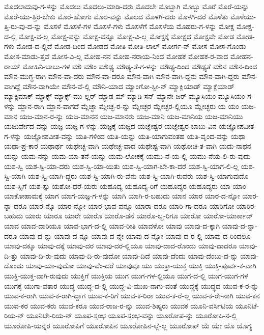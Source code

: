 {ಮೊದಲಾದುವು-ಗ-ಳನ್ನು
ಮೊದಲು
ಮೊದಲು-ಮಾಡಿ-ದರು
ಮೊದಲೇ
ಮೊಬ್ಬಾಗಿ
ಮೊಬ್ಬು
ಮೊರೆ
ಮೊರೆ-ಯನ್ನು
ಮೊರೆ-ಯು-ತ್ತಿರ-ಬೇಕು
ಮೊರೆ-ಹೋಗು
ಮೊಲ-ವನ್ನು
ಮೊಲದ
ಮೊಳಗಿ-ದರು
ಮೊಳಗಿ-ದರೆ
ಮೊಳೆತು
ಮೊಳೆಯು-ತ್ತಿ-ರು-ವು-ದ-ನ್ನು
ಮೊಸಳೆ
ಮೊಸಳೆ-ಗಳ
ಮೊಸಳೆ-ಗಳು
ಮೊಸಳೆಗೆ
ಮೊಸಳೆಯ
ಮೊಹರು-ಗ-ಳನ್ನು
ಮೋಕ್ಷ
ಮೋಕ್ಷ-ದ-ಲ್ಲಿ
ಮೋಕ್ಷ-ವ-ಲ್ಲ
ಮೋಕ್ಷ-ವನ್ನು
ಮೋಕ್ಷ-ವನ್ನೂ
ಮೋಕ್ಷ-ವಿ-ಲ್ಲ
ಮೋಕ್ಷಕ್ಕೆ
ಮೋಕ್ಷದ
ಮೋಕ್ಷವೇ
ಮೋಡ
ಮೋಡ-ಗಳು
ಮೋಡ-ದ-ಲ್ಲಿದೆ
ಮೋಡ-ದಿಂದ
ಮೋಡದ
ಮೋತಿ
ಮೋತಿ-ಲಾಲ್
ಮೋರ್ಗ-ನ್
ಮೋಸ
ಮೋಸ-ಗೊಂಡು
ಮೋಸ-ಮಾಡು-ತ್ತವೆ
ಮೋಸ-ವಿ-ಲ್ಲ
ಮೋಹ-ನನ
ಮೋಹ-ನರಾಯ-ನಿಂದ
ಮೋಹಕ
ಮೋಹಕ-ರ-ವಾದ
ಮೋಹನ-ರಾಯ್
ಮೋಹಿನಿ-ಬಾಬು-ಗಳ
ಮೌ
ಮೌಂ
ಮೌಢ್ಯ
ಮೌಢ್ಯ-ತೆ-ಗ-ಳನ್ನು
ಮೌಢ್ಯ-ದಿಂದ
ಮೌಢ್ಯತೆ
ಮೌನ
ಮೌನ-ದಿಂದ
ಮೌನ-ಮುಗ್ಧ-ರಾಗಿ
ಮೌನ-ವಾ-ದರು
ಮೌನ-ವಾ-ದರೂ
ಮೌನ-ವಾಗಿ
ಮೌನ-ವಾಗಿ-ದ್ದನು
ಮೌನ-ವಾಗಿ-ದ್ದರು
ಮೌನ-ವಾಗಿದ್ದೆ
ಮೌನ-ವಾಗಿಯೇ
ಮೌನ-ವೆ-ಲ್ಲಿ
ಮೌನಿ-ಯಾದ
ಮ್ಯಾಂಗೋ-ಸ್ಪೀ-ನ್
ಮ್ಯಾಕ್ಲಿಯಾಡ್
ಮ್ಯಾಕ್ಲೆಯಾಡ್
ಮ್ಯಾಕ್ಸಿಮಾಕ್
ಮ್ಯಾಕ್ಸ್
ಮ್ಯಾಕ್ಸ್-ಮು-ಲ್ಲರ್
ಮ್ಯಾಡ-ಮ್
ಮ್ಯಾಡಿ-ಸನ್
ಮ್ಯಾನೇ-ಜರ್
ಮ್ಯೂಸಿಯಂ
ಮ್ಯೂಸಿಯಂ-ಗ-ಳನ್ನು
ಮ್ಲಾನ-ರಾಗಿ
ಮ್ಲಾನ-ವಾಗದೆ
ಮ್ಲೆಚ್ಛಾ
ಮ್ಲೇಚ್ಛ-ರ-ನ್ನು
ಮ್ಲೇಚ್ಛರ
ಮ್ಲೇಚ್ಛರ-ಲ್ಲಿಯೂ
ಮ್ಲೇಚ್ಛರು
ಯ
ಯಂ
ಯಜ-ಮಾನ
ಯಜ-ಮಾನ-ರ-ನ್ನು
ಯಜ-ಮಾನನ
ಯಜ-ಮಾನರು
ಯಜ-ಮಾನಿ
ಯಜ-ಮಾನಿಯ
ಯಜ-ಮಾನಿಯು
ಯಜುರ್ವೇದ-ವನ್ನು
ಯಜ್ಞ
ಯಜ್ಞ-ಗ-ಳನ್ನು
ಯಜ್ಞಕ್ಕೆ
ಯಜ್ಞದ
ಯಜ್ಞೇಶ್ವರ
ಯಜ್ಞೇಶ್ವರ-ಬಾಬು-ವಿನ
ಯಜ್ಞೋಪವೀತ-ಗ-ಳನ್ನು
ಯಜ್ಞೋಪವೀತ-ವನ್ನು
ಯತಿ-ಗಳಿಂದ
ಯತಿ-ಯನ್ನು
ಯತಿ-ಯಾಗುವಂತಹ
ಯತಿ-ವೃಂದ-ವನ್ನು
ಯಥಾ
ಯಥಾ-ಪ್ರ-ಕಾರ
ಯಥಾರ್ಥ
ಯಥೇಚ್ಛ-ವಾಗಿ
ಯಥೇಚ್ಛ-ವಾದ
ಯಥೇಷ್ಟ-ವಾಗಿ
ಯಥೋಚಿ-ತ-ವಾಗಿ
ಯದು-ನಾಥನ
ಯನ್ನು
ಯಮ-ನನ್ನು
ಯಮ-ಯಾ-ತನೆ-ಯನ್ನು
ಯಮ-ಲೋಕಕ್ಕೆ
ಯಮು-ನೆ-ಯ-ಲ್ಲಿ
ಯಮು-ನೆಯ-ಲಿ-ರು-ವುದು
ಯಶ-ಸ್ವಿ
ಯಶ-ಸ್ವಿ-ಯಾ-ದರು
ಯಶ-ಸ್ವಿ-ಯಾ-ಯಿತು
ಯಶ-ಸ್ವಿ-ಯಾಗ-ಬೇ-ಕಾ-ದರೆ
ಯಶ-ಸ್ವಿ-ಯಾಗ-ಲಿ-ಲ್ಲ
ಯಶ-ಸ್ವಿ-ಯಾಗಿ
ಯಶ-ಸ್ವಿ-ಯಾಗಿ-ದ್ದರು
ಯಶ-ಸ್ವಿ-ಯಾಗಿ-ರು-ವೆನು
ಯಶ-ಸ್ವಿ-ಯಾಗಿ-ರುವರು
ಯಶ-ಸ್ವಿ-ಯಾಗುವುದೊ
ಯಶ-ಸ್ಸಿಗೆ
ಯಶ-ಸ್ಸು
ಯಶೋ-ಧರೆ-ಯರು
ಯಹೂದ್ಯ
ಯಹೂದ್ಯ-ರಿಗೆ
ಯಹೂದ್ಯರ
ಯಹೂದ್ಯರು
ಯಾ
ಯಾಂ
ಯಾಕೋಹಾಮಕ್ಕೆ
ಯಾಗ
ಯಾಗ-ಯಜ್ಞ-ಗ-ಳನ್ನು
ಯಾಗಿ
ಯಾಗಿ-ರ-ಬಹುದು
ಯಾನ
ಯಾರ
ಯಾರ-ದ-ನ್ನೋ
ಯಾರ-ನ್ನಾ-ದರೂ
ಯಾರ-ನ್ನೊ
ಯಾರ-ನ್ನೋ
ಯಾರ-ಭಾವ-ವನ್ನೂ
ಯಾರಾ-ದರೂ
ಯಾರಿ-ಗಾ-ದರೂ
ಯಾರಿಗೋ
ಯಾರಿರ-ಬಹುದು
ಯಾರು
ಯಾರೂ
ಯಾರೇ
ಯಾರೊ
ಯಾರೊ-ಡನೆ
ಯಾರೊ-ಬ್ಬ-ರಿಗೂ
ಯಾರೋ
ಯಾರೋ-ಯಾರ್ಕಾಡ್
ಯಾವ
ಯಾವ-ದಾರಿಯೂ
ಯಾವ-ಭಾಗ-ದ-ಲ್ಲಿ
ಯಾವ-ರೀತಿ
ಯಾವಳೋ
ಯಾವು
ಯಾವು-ದ-ಕ್ಕಾಗಿ
ಯಾವು-ದ-ನ್ನಾ-ದರೂ
ಯಾವು-ದ-ನ್ನು
ಯಾವು-ದ-ನ್ನೂ
ಯಾವು-ದ-ನ್ನೇ
ಯಾವು-ದ-ನ್ನೋ
ಯಾವು-ದ-ರ-ಲ್ಲಿ
ಯಾವು-ದ-ರಿಂದಲೂ
ಯಾವು-ದಕ್ಕೂ
ಯಾವು-ದಕ್ಕೆ
ಯಾವು-ದರ
ಯಾವು-ದರ-ಲ್ಲಿಯೂ
ಯಾವು-ದಾದ-ರೊಂದು
ಯಾವು-ದಾದರೂ
ಯಾವು-ದಿ-ತ್ತು
ಯಾವು-ದಿ-ರು-ವುದು
ಯಾವು-ದಿ-ರು-ವುದೋ
ಯಾವು-ದಿದೆ
ಯಾವು-ದೆಂದು
ಯಾವು-ದೆಂಬು-ದ-ನ್ನು
ಯಾವು-ದೊಂದು
ಯಾವು-ಯಾ-ವುದೋ
ಯಾವು-ವೆಂ-ದರೆ
ಯಾವುವೂ
ಯು
ಯುಕ್ತಾ-ಯುಕ್ತ
ಯುಕ್ತಿ
ಯುಕ್ತಿ-ಪೂರ್ವ-ಕ-ವಾಗಿ
ಯುಕ್ತಿ-ಯುಕ್ತ-ವಾಗಿ-ರುವುದು
ಯುಕ್ತಿಗೆ
ಯುಕ್ತಿಯ
ಯುಗ
ಯುಗ-ಗಳ-ಲ್ಲಿಯೂ
ಯುಗ-ದ-ಲ್ಲಿ
ಯುಗ-ಯುಗ-ಗಳ
ಯುಗಕ್ಕೆ
ಯುಗಾ-ವತಾರ
ಯುದ್ಧ
ಯುದ್ಧ-ದ-ಲ್ಲಿ
ಯುದ್ಧ-ವಿ-ಮುಖ-ನಾಗು-ವಂತೆ
ಯುದ್ಧಕ್ಕೆ
ಯುದ್ಧದ
ಯುವ-ಕ-ರ-ನ್ನು
ಯುವ-ಕ-ರಾಗಿ
ಯುವ-ಕ-ರಾಗಿ-ದ್ದಾಗ
ಯುವ-ಕ-ರಿಗೆ
ಯುವ-ಕ-ರಿರಾ
ಯುವ-ಕ-ರೆ-ಲ್ಲ
ಯುವ-ಕ-ರೇ-ನಾಗಿ
ಯುವ-ಕನ
ಯುವ-ಕರ
ಯುವ-ಕರು
ಯುವ-ಕರೂ
ಯುವ-ರಾಜ-ರ-ನ್ನು
ಯುವ-ಶಿಷ್ಯರು
ಯುವಕ
ಯೂನಿ-ವರ್ಸಿಟಿಯ
ಯೂನಿಟೆ-ರಿಯ-ನ್
ಯೂನಿಟೇ-ರಿಯ-ನ್
ಯೂಪ-ಸ್ತಂಭ
ಯೂಪ-ಸ್ತಂಭ-ವನ್ನು
ಯೂರೋಪ-ನ್ನು
ಯೂರೋಪಿ-ನ-ಲ್ಲಿ
ಯೂರೋಪಿ-ಯನ್ನರ
ಯೂರೋಪಿಗೆ
ಯೂರೋಪಿನ
ಯೂರೋಪಿನ-ಲ್ಲೆ-ಲ್ಲ
ಯೂರೋಪ್
ಯೆ
ಯೇ
ಯೊ
ಯೊಗ್ಯ
}
